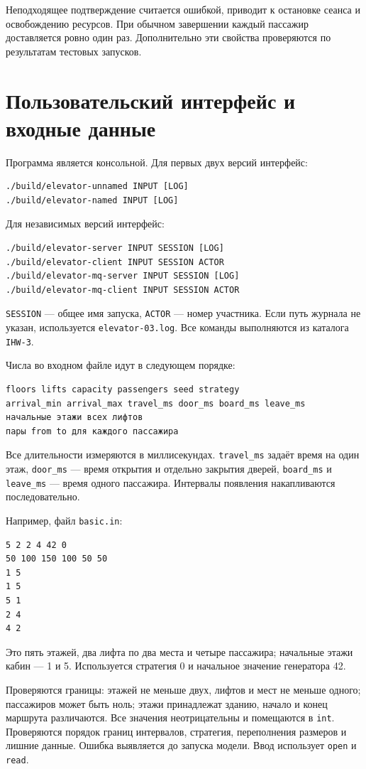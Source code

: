 \documentclass[12pt,a4paper]{article}
\begin{document}
Неподходящее подтверждение считается ошибкой, приводит к остановке
сеанса и освобождению ресурсов. При обычном завершении каждый пассажир
доставляется ровно один раз. Дополнительно эти свойства проверяются
по результатам тестовых запусков.

\section{Пользовательский интерфейс и входные данные}

Программа является консольной. Для первых двух версий интерфейс:
\begin{verbatim}
./build/elevator-unnamed INPUT [LOG]
./build/elevator-named INPUT [LOG]
\end{verbatim}
Для независимых версий интерфейс:
\begin{verbatim}
./build/elevator-server INPUT SESSION [LOG]
./build/elevator-client INPUT SESSION ACTOR
./build/elevator-mq-server INPUT SESSION [LOG]
./build/elevator-mq-client INPUT SESSION ACTOR
\end{verbatim}
\verb|SESSION| --- общее имя запуска, \verb|ACTOR| --- номер участника.
Если путь журнала не указан, используется \verb|elevator-03.log|.
Все команды выполняются из каталога \verb|IHW-3|.

Числа во входном файле идут в следующем порядке:
{\small
\begin{verbatim}
floors lifts capacity passengers seed strategy
arrival_min arrival_max travel_ms door_ms board_ms leave_ms
начальные этажи всех лифтов
пары from to для каждого пассажира
\end{verbatim}
}
Все длительности измеряются в миллисекундах. \verb|travel_ms| задаёт
время на один этаж, \verb|door_ms| --- время открытия и отдельно
закрытия дверей, \verb|board_ms| и \verb|leave_ms| --- время одного
пассажира. Интервалы появления накапливаются последовательно.

\noindent\begin{minipage}{\linewidth}
Например, файл \verb|basic.in|:
\begin{verbatim}
5 2 2 4 42 0
50 100 150 100 50 50
1 5
1 5
5 1
2 4
4 2
\end{verbatim}
\smallskip
Это пять этажей, два лифта по два места и четыре пассажира; начальные
этажи кабин --- 1 и 5. Используется стратегия 0 и начальное значение
генератора 42.
\end{minipage}
\par

Проверяются границы: этажей не меньше двух, лифтов и мест не меньше
одного; пассажиров может быть ноль; этажи принадлежат зданию, начало
и конец маршрута различаются. Все значения неотрицательны и помещаются
в \verb|int|. Проверяются порядок границ интервалов, стратегия,
переполнения размеров и лишние данные. Ошибка выявляется до запуска
модели. Ввод использует \verb|open| и \verb|read|.
\end{document}
